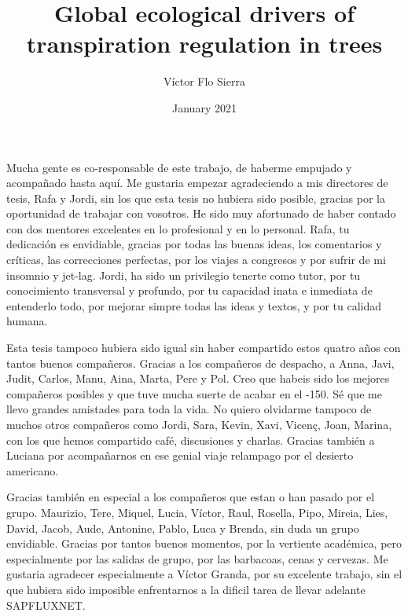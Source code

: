 \documentclass[11pt,twoside]{reedthesis}
\title{Global ecological drivers of transpiration regulation in trees}
\author{Víctor Flo Sierra}
\date{January 2021}
\begin{document}
  \maketitle

\frontmatter %
\pagestyle{empty} %
  \begin{acknowledgements}
    \setlength{\parindent}{30pt} Mucha gente es co-responsable de este
    trabajo, de haberme empujado y acompañado hasta aquí. Me gustaria
    empezar agradeciendo a mis directores de tesis, Rafa y Jordi, sin los
    que esta tesis no hubiera sido posible, gracias por la oportunidad de
    trabajar con vosotros. He sido muy afortunado de haber contado con dos
    mentores excelentes en lo profesional y en lo personal. Rafa, tu
    dedicación es envidiable, gracias por todas las buenas ideas, los
    comentarios y críticas, las correcciones perfectas, por los viajes a
    congresos y por sufrir de mi insomnio y jet-lag. Jordi, ha sido un
    privilegio tenerte como tutor, por tu conocimiento transversal y
    profundo, por tu capacidad inata e inmediata de entenderlo todo, por
    mejorar simpre todas las ideas y textos, y por tu calidad humana.\par
    Esta tesis tampoco hubiera sido igual sin haber compartido estos quatro
    años con tantos buenos compañeros. Gracias a los compañeros de despacho,
    a Anna, Javi, Judit, Carlos, Manu, Aina, Marta, Pere y Pol. Creo que
    habeis sido los mejores compañeros posibles y que tuve mucha suerte de
    acabar en el -150. Sé que me llevo grandes amistades para toda la vida.
    No quiero olvidarme tampoco de muchos otros compañeros como Jordi, Sara,
    Kevin, Xavi, Vicenç, Joan, Marina, con los que hemos compartido café,
    discusiones y charlas. Gracias también a Luciana por acompañarnos en ese
    genial viaje relampago por el desierto americano.\par
    Gracias también en especial a los compañeros que estan o han pasado por
    el grupo. Maurizio, Tere, Miquel, Lucia, Víctor, Raul, Rosella, Pipo,
    Mireia, Lies, David, Jacob, Aude, Antonine, Pablo, Luca y Brenda, sin
    duda un grupo envidiable. Gracias por tantos buenos momentos, por la
    vertiente académica, pero especialmente por las salidas de grupo, por
    las barbacoas, cenas y cervezas. Me gustaria agradecer especialmente a
    Víctor Granda, por su excelente trabajo, sin el que hubiera sido
    imposible enfrentarnos a la dificil tarea de llevar adelante SAPFLUXNET.

\end{acknowledgements}
\end{document}
